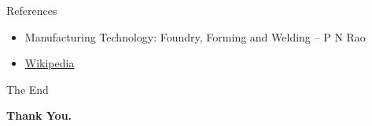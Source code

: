 \documentclass[11pt,t]{beamer}
\begin{document}
    \begin{frame}{References}
        \begin{itemize}
            \item Manufacturing Technology: Foundry, Forming and Welding -- P N Rao
            \item \href{https://wikipedia.com}{\color{blue}Wikipedia}
        \end{itemize}
    \end{frame}

    \begin{frame}{The End}
        \begin{center}
            \vfill
            \textbf{\Huge Thank You.}
            \vfill
        \end{center}
    \end{frame}
\end{document}
